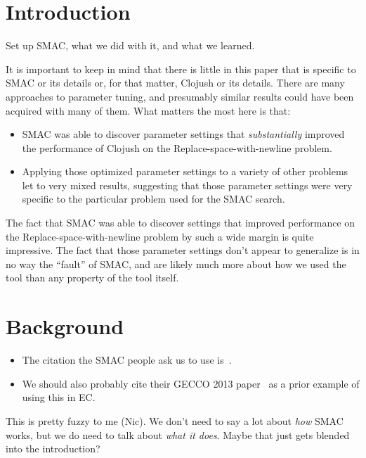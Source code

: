 \section{Introduction}
\label{sec:introduction}

Set up SMAC, what we did with it, and what we learned.

It is important to keep in mind that there is little in this paper that is
specific to SMAC or its details or, for that matter, Clojush or its details. 
There are many approaches to parameter
tuning, and presumably similar results could have been acquired with many of
them. What matters the most here is that:
\begin{itemize}
	\item SMAC was able to discover parameter settings that 
	\emph{substantially} improved the performance
	of Clojush on the Replace-space-with-newline problem.
	\item Applying those optimized parameter settings to a variety of other
	problems let to very mixed results, suggesting that those parameter
	settings were very specific to the particular problem used for the SMAC
	search.
\end{itemize}
The fact that SMAC was able to discover settings that improved
performance on the Replace-space-with-newline problem by such a wide margin
is quite impressive. The fact that those parameter settings don't appear to
generalize is in no way the ``fault'' of SMAC, and are likely much more 
about how we used the tool than any property of the tool itself.

\section{Background}
\label{sec:background}

\begin{itemize}
	\item The citation the SMAC people ask us to use is~\cite{HutHooLey11-SMAC}.
	\item We should also probably cite their GECCO 2013 
	paper~\cite{hutter2013evaluation} as a prior example of using this in EC.
\end{itemize}

This is pretty fuzzy to me (Nic). We don't need to say a lot about \emph{how}
SMAC works, but we do need to talk about \emph{what it does}. Maybe that just
gets blended into the introduction?

